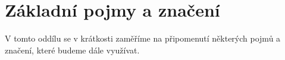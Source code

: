 \section{Základní pojmy a značení}\label{sec:zakladni-pojmy-a-znaceni}

V tomto oddílu se v krátkosti zaměříme na připomenutí některých pojmů a značení, které budeme dále využívat.

